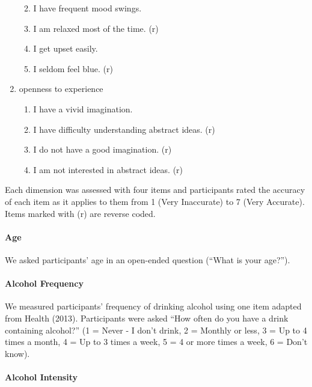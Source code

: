 \documentclass[
  letterpaper,
  DIV=11,
  numbers=noendperiod]{scrartcl}
\let\oldparagraph\paragraph
\renewcommand{\paragraph}[1]{\oldparagraph{#1}\mbox{}}
\begin{document}
\begin{enumerate}
  \begin{enumerate}
  \def\labelenumii{\roman{enumii}.}
  \item
    I have frequent mood swings.
  \item
    I am relaxed most of the time. (r)
  \item
    I get upset easily.
  \item
    I seldom feel blue. (r)
  \end{enumerate}
\item
  openness to experience

  \begin{enumerate}
  \def\labelenumii{\roman{enumii}.}
  \item
    I have a vivid imagination.
  \item
    I have difficulty understanding abstract ideas. (r)
  \item
    I do not have a good imagination. (r)
  \item
    I am not interested in abstract ideas. (r)
  \end{enumerate}
\end{enumerate}

Each dimension was assessed with four items and participants rated the
accuracy of each item as it applies to them from 1 (Very Inaccurate) to
7 (Very Accurate). Items marked with (r) are reverse coded.

\hypertarget{age}{%
\paragraph{Age}\label{age}}

We asked participants' age in an open-ended question (``What is your
age?'').

\hypertarget{alcohol-frequency}{%
\paragraph{Alcohol Frequency}\label{alcohol-frequency}}

We measured participants' frequency of drinking alcohol using one item
adapted from Health (2013). Participants were asked ``How often do you
have a drink containing alcohol?'' (1 = Never - I don't drink, 2 =
Monthly or less, 3 = Up to 4 times a month, 4 = Up to 3 times a week, 5
= 4 or more times a week, 6 = Don't know).

\hypertarget{alcohol-intensity}{%
\paragraph{Alcohol Intensity}\label{alcohol-intensity}}
\end{document}
